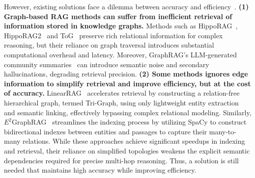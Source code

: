 However, existing solutions face a dilemma between accuracy and efficiency~\cite{han2025rag, xiang2025use}. \textbf{(1) Graph-based RAG methods can suffer from inefficient retrieval of information stored in knowledge graphs.} Methods such as HippoRAG~\cite{jimenez2024hipporag}, HippoRAG2~\cite{gutierrez2025rag} and ToG~\cite{sun2023think, ma2024think} preserve rich relational information for complex reasoning, but their reliance on graph traversal introduces substantial computational overhead and latency. Moreover, GraphRAG’s LLM-generated community summaries~\cite{edge2024local} can introduce semantic noise and secondary hallucinations, degrading retrieval precision. 
\textbf{(2) Some methods ignores edge information to simplify retrieval and improve efficiency, but at the cost of accuracy.} 
LinearRAG~\cite{zhuang2025linearrag} accelerates retrieval by constructing a relation-free hierarchical graph, termed Tri-Graph, using only lightweight entity extraction and semantic linking, effectively bypassing complex relational modeling. Similarly, $E^2$GraphRAG~\cite{zhao20252graphrag} streamlines the indexing process by utilizing SpaCy to construct bidirectional indexes between entities and passages to capture their many-to-many relations. While these approaches achieve significant speedups in indexing and retrieval, their reliance on simplified topologies weakens the explicit semantic dependencies required for precise multi-hop reasoning. Thus, a solution is still needed that maintains high accuracy while improving efficiency.




